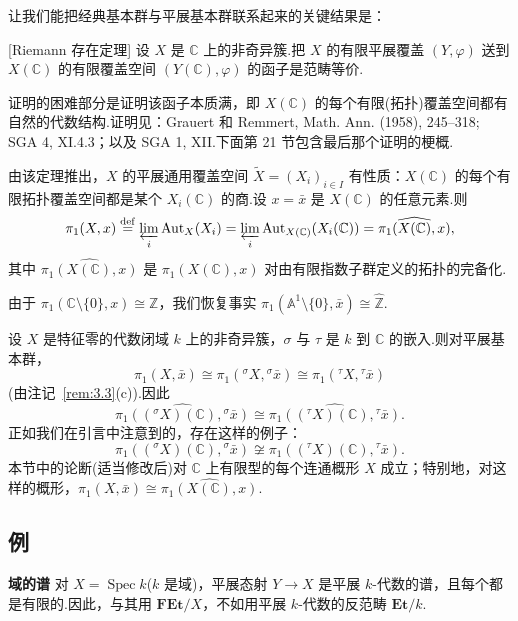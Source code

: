 让我们能把经典基本群与平展基本群联系起来的关键结果是：

\begin{theorem}\label{thm:3.4}[Riemann 存在定理]
设 $X$ 是 $\mathbb{C}$ 上的非奇异簇.把 $X$ 的有限平展覆盖 $(Y, \varphi)$ 送到 $X(\mathbb{C})$ 的有限覆盖空间 $(Y(\mathbb{C}), \varphi)$ 的函子是范畴等价.
\end{theorem}

证明的困难部分是证明该函子本质满，即 $X(\mathbb{C})$ 的每个有限(拓扑)覆盖空间都有自然的代数结构.证明见：Grauert 和 Remmert, Math. Ann. (1958), 245--318; SGA 4, XI.4.3；以及 SGA 1, XII.下面第 21 节包含最后那个证明的梗概.

由该定理推出，$X$ 的平展通用覆盖空间 $\widetilde{X} = (X_i)_{i \in I}$ 有性质：$X(\mathbb{C})$ 的每个有限拓扑覆盖空间都是某个 $X_i(\mathbb{C})$ 的商.设 $x = \bar{x}$ 是 $X(\mathbb{C})$ 的任意元素.则
\[
\pi_1(X, x) \overset{\mathrm{def}}{=} \varprojlim_{i} \operatorname{Aut}_X(X_i) = \varprojlim_{i} \operatorname{Aut}_{X(\mathbb{C})}(X_i(\mathbb{C})) = \widehat{\pi_1(X(\mathbb{C}), x)},
\]
其中 $\widehat{\pi_1(X(\mathbb{C}), x)}$ 是 $\pi_1(X(\mathbb{C}), x)$ 对由有限指数子群定义的拓扑的完备化.

由于 $\pi_1(\mathbb{C} \setminus \{0\}, x) \cong \mathbb{Z}$，我们恢复事实 $\pi_1(\mathbb{A}^{1} \setminus \{0\}, \bar{x}) \cong \widehat{\mathbb{Z}}$.

\begin{remark}\label{rem:3.5}
设 $X$ 是特征零的代数闭域 $k$ 上的非奇异簇，$\sigma$ 与 $\tau$ 是 $k$ 到 $\mathbb{C}$ 的嵌入.则对平展基本群，
\[
\pi_1(X, \bar{x}) \cong \pi_1({}^{\sigma}X, {}^{\sigma}\bar{x}) \cong \pi_1({}^{\tau}X, {}^{\tau}\bar{x})
\]
(由注记~\ref{rem:3.3}(c)).因此
\[
\widehat{\pi_1(({}^{\sigma}X)(\mathbb{C}), {}^{\sigma}\bar{x})} \cong \widehat{\pi_1(({}^{\tau}X)(\mathbb{C}), {}^{\tau}\bar{x})}.
\]
正如我们在引言中注意到的，存在这样的例子：
\[
\pi_1(({}^{\sigma}X)(\mathbb{C}), {}^{\sigma}\bar{x}) \not\cong \pi_1(({}^{\tau}X)(\mathbb{C}), {}^{\tau}\bar{x}).
\]
本节中的论断(适当修改后)对 $\mathbb{C}$ 上有限型的每个连通概形 $X$ 成立；特别地，对这样的概形，$\pi_1(X, \bar{x}) \cong \widehat{\pi_1(X(\mathbb{C}), x)}$.
\end{remark}

\subsection*{例}

\textbf{域的谱} 对 $X = \operatorname{Spec} k$($k$ 是域)，平展态射 $Y \to X$ 是平展 $k$-代数的谱，且每个都是有限的.因此，与其用 $\mathbf{FEt}/X$，不如用平展 $k$-代数的反范畴 $\mathbf{Et}/k$.


